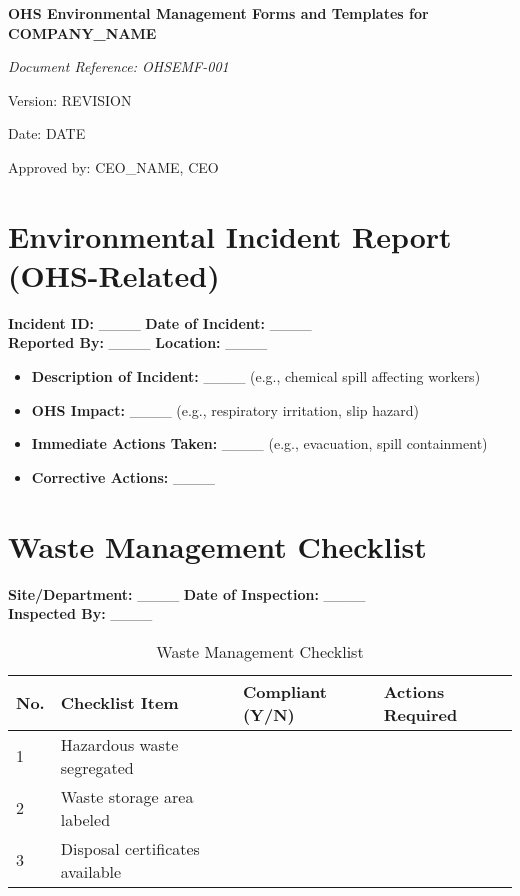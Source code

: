 \documentclass[12pt]{article}
\begin{document}
\begin{titlepage}
    \centering
    \vspace*{2cm}
    {\LARGE\bfseries OHS Environmental Management Forms and Templates for {{COMPANY_NAME}}\par}
    \vspace{1cm}
    {\large\itshape Document Reference: OHSEMF-001\par}
    \vspace{0.5cm}
    {\normalsize Version: {{REVISION}}\par}
    \vspace{0.5cm}
    {\normalsize Date: {{DATE}}\par}
    \vspace{2cm}
    {\normalsize Approved by: {{CEO_NAME}}, CEO\par}
\end{titlepage}

\section{Environmental Incident Report (OHS-Related)}

\textbf{Incident ID:} \_\_\_\_ \textbf{Date of Incident:} \_\_\_\_\\
\textbf{Reported By:} \_\_\_\_ \textbf{Location:} \_\_\_\_

\begin{itemize}
    \item \textbf{Description of Incident:} \_\_\_\_ (e.g., chemical spill affecting workers)
    \item \textbf{OHS Impact:} \_\_\_\_ (e.g., respiratory irritation, slip hazard)
    \item \textbf{Immediate Actions Taken:} \_\_\_\_ (e.g., evacuation, spill containment)
    \item \textbf{Corrective Actions:} \_\_\_\_
\end{itemize}

\section{Waste Management Checklist}

\textbf{Site/Department:} \_\_\_\_ \textbf{Date of Inspection:} \_\_\_\_\\
\textbf{Inspected By:} \_\_\_\_

\begin{table}[h]
    \centering
    \begin{tabular}{p{1cm}p{5cm}p{2cm}p{3cm}}
        \toprule
        \textbf{No.} & \textbf{Checklist Item} & \textbf{Compliant (Y/N)} & \textbf{Actions Required} \\
        \midrule
        1 & Hazardous waste segregated & & \\
        2 & Waste storage area labeled & & \\
        3 & Disposal certificates available & & \\
        \bottomrule
    \end{tabular}
    \caption{Waste Management Checklist}
\end{table}
\end{document}
